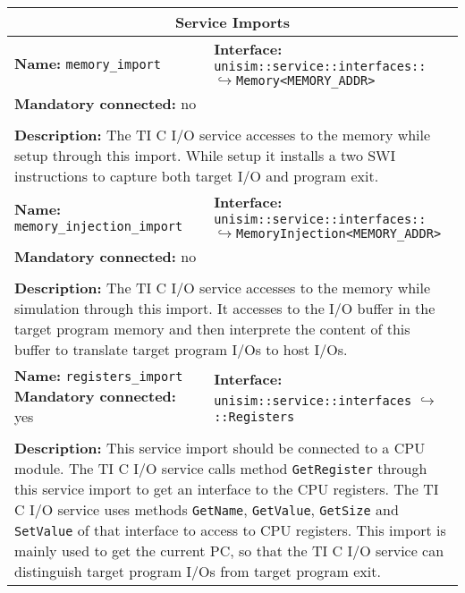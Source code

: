 \begin{center}
\begin{tabular}{|p{7.5cm}|p{7.5cm}|}
		\multicolumn{2}{|c|}{\textbf{\large Service Imports}}\\
		\hline
		\multicolumn{1}{|p{7.5cm}}{\textbf{Name:} \texttt{memory\_import}} & \multicolumn{1}{p{7.5cm}|}{\textbf{Interface:} \newline \texttt{unisim::service::interfaces::} \newline$\hookrightarrow$\texttt{Memory<MEMORY\_ADDR>}}\\
		\multicolumn{2}{|p{15cm}|}{\textbf{Mandatory connected:} no}\\
		\multicolumn{2}{|l|}{}\\
		\multicolumn{2}{|p{15cm}|}{\textbf{Description:} \newline The TI C I/O service accesses to the memory while setup through this import. While setup it installs a two SWI instructions to capture both target I/O and program exit.}\\
		\hline
		\multicolumn{1}{|p{7.5cm}}{\textbf{Name:} \texttt{memory\_injection\_import}} & \multicolumn{1}{p{7.5cm}|}{\textbf{Interface:} \newline \texttt{unisim::service::interfaces::} \newline$\hookrightarrow$\texttt{MemoryInjection<MEMORY\_ADDR>}}\\
		\multicolumn{2}{|p{15cm}|}{\textbf{Mandatory connected:} no}\\
		\multicolumn{2}{|l|}{}\\
		\multicolumn{2}{|p{15cm}|}{\textbf{Description:} \newline The TI C I/O service accesses to the memory while simulation through this import. It accesses to the I/O buffer in the target program memory and then interprete the content of this buffer to translate target program I/Os to host I/Os.}\\
		\hline
		\multicolumn{1}{|p{7.5cm}}{\textbf{Name:} \texttt{registers\_import} \newline \textbf{Mandatory connected:} yes} & \multicolumn{1}{p{7.5cm}|}{\textbf{Interface:} \newline \texttt{unisim::service::interfaces} \newline$\hookrightarrow$\texttt{::Registers}}\\
		\multicolumn{2}{|l|}{}\\
		\multicolumn{2}{|p{15cm}|}{\textbf{Description:} \newline This service import should be connected to a CPU module. The TI C I/O service calls method \texttt{GetRegister} through this service import to get an interface to the CPU registers. The TI C I/O service uses methods \texttt{GetName}, \texttt{GetValue}, \texttt{GetSize} and \texttt{SetValue} of that interface to access to CPU registers. This import is mainly used to get the current PC, so that the TI C I/O service can distinguish target program I/Os from target program exit.}\\
		\hline
	\end{tabular}
\end{center}

